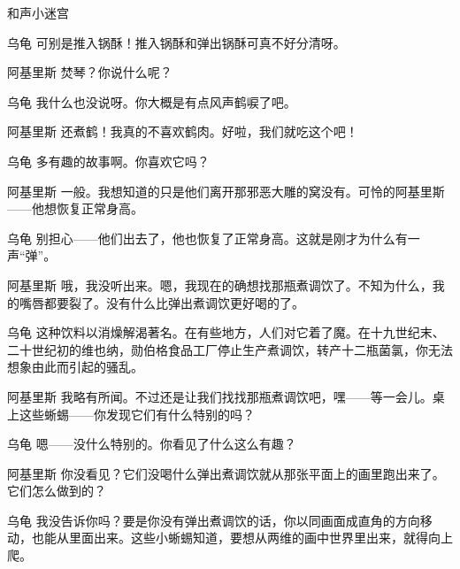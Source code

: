 \begin{dialog}{和声小迷宫}
\begin{dialogue}
\item[乌龟]可别是推入锅酥！推入锅酥和弹出锅酥可真不好分清呀。

\begin{dialogue}
  \item[]
  \begin{dialogue}
  \item[]
    \begin{dialogue}
      \item[阿基里斯]焚琴？你说什么呢？

      \item[乌龟]我什么也没说呀。你大概是有点风声鹤唳了吧。

      \item[阿基里斯]还煮鹤！我真的不喜欢鹤肉。好啦，我们就吃这个吧！

    \end{dialogue}

    \item[乌龟]多有趣的故事啊。你喜欢它吗？

    \item[阿基里斯]一般。我想知道的只是他们离开那邪恶大雕的窝没有。可怜的阿基里斯——他想恢复正常身高。

    \item[乌龟]别担心——他们出去了，他也恢复了正常身高。这就是刚才为什么有一声“弹”。

    \item[阿基里斯]哦，我没听出来。嗯，我现在的确想找那瓶煮调饮了。不知为什么，我的嘴唇都要裂了。没有什么比弹出煮调饮更好喝的了。

    \item[乌龟]这种饮料以消燥解渴著名。在有些地方，人们对它着了魔。在十九世纪末、二十世纪初的维也纳，勋伯格食品工厂停止生产煮调饮，转产十二瓶菌氯，你无法想象由此而引起的骚乱。

    \item[阿基里斯]我略有所闻。不过还是让我们找找那瓶煮调饮吧，嘿——等一会儿。桌上这些蜥蜴——你发现它们有什么特别的吗？

    \item[乌龟]嗯——没什么特别的。你看见了什么这么有趣？

    \item[阿基里斯]你没看见？它们没喝什么弹出煮调饮就从那张平面上的画里跑出来了。它们怎么做到的？

    \item[乌龟]我没告诉你吗？要是你没有弹出煮调饮的话，你以同画面成直角的方向移动，也能从里面出来。这些小蜥蜴知道，要想从两维的画中世界里出来，就得向上爬。


\end{dialogue}
\end{dialogue}
\end{dialogue}
\end{dialog}
